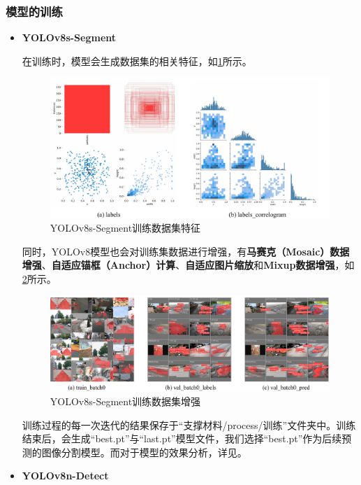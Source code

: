\documentclass{MathorCupmodeling}
\begin{document}
	\subsubsection{模型的训练}
	\begin{itemize}
		\item \textbf{YOLOv8s-Segment}

		在训练时，模型会生成数据集的相关特征，如\textcolor{blue}{\cref{fig:YOLOv8s-Segment训练数据集特征}}所示。
		\begin{figure}[H]
			\centering
			\includegraphics[scale=0.5]{Figures/segment/SegementLabels.pdf}
			\caption{YOLOv8s-Segment训练数据集特征}
			\label{fig:YOLOv8s-Segment训练数据集特征}
		\end{figure}

		同时，YOLOv8模型也会对训练集数据进行增强，有\textbf{马赛克（Mosaic）数据增强}、\textbf{自适应锚框（Anchor）计算}、\textbf{自适应图片缩放}和\textbf{Mixup数据增强}，如\textcolor{blue}{\cref{fig:YOLOv8s-Segment训练数据集增强}}所示。
		\begin{figure}[H]
			\centering
			\includegraphics[scale=0.5]{Figures/segment/Segment训练.pdf}
			\caption{YOLOv8s-Segment训练数据集增强}
			\label{fig:YOLOv8s-Segment训练数据集增强}
		\end{figure}

		训练过程的每一次迭代的结果保存于“支撑材料/process/训练”文件夹中。训练结束后，会生成“best.pt”与“last.pt”模型文件，我们选择“best.pt”作为后续预测的图像分割模型。而对于模型的效果分析，详见\textcolor{blue}{}。
		\item \textbf{YOLOv8n-Detect}
		

\end{itemize}
\end{document}

